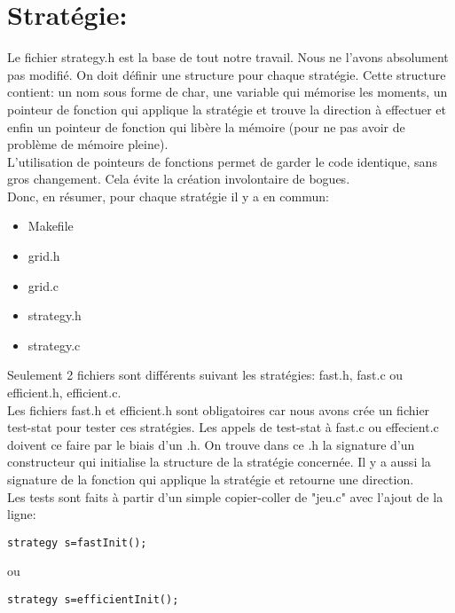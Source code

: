 \documentclass{report}
\begin{document}
\section*{Stratégie:}
\begin{description}
Le fichier strategy.h est la base de tout notre travail. Nous ne l'avons absolument pas modifié. On doit définir une structure pour chaque stratégie. Cette structure contient: un nom sous forme de char, une variable qui mémorise les moments, un pointeur de fonction qui applique la stratégie et trouve la direction à effectuer et enfin un pointeur de fonction qui libère la mémoire (pour ne pas avoir de problème de mémoire pleine).\\
L'utilisation de pointeurs de fonctions permet de garder le code identique, sans gros changement. Cela évite la création involontaire de bogues.\\
Donc, en résumer, pour chaque stratégie il y a en commun:
\end{description}
\begin{itemize}
\item Makefile
\item grid.h
\item grid.c
\item strategy.h
\item strategy.c\\
\end{itemize}
\begin{description}
Seulement 2 fichiers sont différents suivant les stratégies: fast.h, fast.c ou efficient.h, efficient.c.\\
Les fichiers fast.h et efficient.h sont obligatoires car nous avons crée un fichier test-stat pour tester ces stratégies. Les appels de test-stat à fast.c ou effecient.c doivent ce faire par le biais d'un .h. On trouve dans ce .h la signature d'un constructeur qui initialise la structure de la stratégie concernée. Il y a aussi la signature de la fonction qui applique la stratégie et retourne une direction.\\
Les tests sont faits à partir d'un simple copier-coller de "jeu.c" avec l'ajout de la ligne:
\end{description}
\begin{lstlisting}[frame=single]
strategy s=fastInit();
\end{lstlisting}
ou
\begin{lstlisting}[frame=single]
strategy s=efficientInit();
\end{lstlisting}
\end{document}

